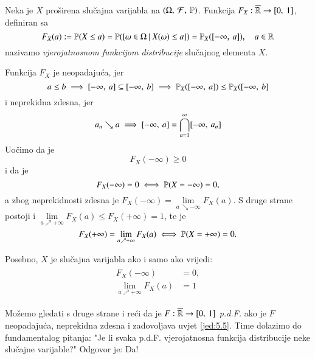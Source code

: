 \begin{defn}    \label{defn:5.4}
    Neka je $X$ pro\v sirena slu\v cajna varijabla na $(\Omega, \: \mathcal{F}, \: \mathbb{P})$.
    Funkcija $F_X : \overline{\mathbb{R}} \to [{0}, \:{1}]$, definiran sa
    \begin{equation*}
        F_X (a) := \mathbb{P} (X \leq a) = \mathbb{P} (\{{\omega \in \Omega} \: | \: {X(\omega) \leq a}\}) = \mathbb{P}_X ([{-\infty}, \:{a}]), \quad a \in \mathbb{R}
    \end{equation*}
    nazivamo \emph{vjerojatnosnom funkcijom distribucije} slu\v cajnog elementa $X$.
\end{defn}

Funkcija $F_X$ je neopadaju\' ca, jer
\begin{equation*}
    a \leq b \implies [{-\infty}, \:{a}] \subseteq [{-\infty}, \:{b}] \implies \mathbb{P}_X ([{-\infty}, \:{a}]) \leq \mathbb{P}_X ([{-\infty}, \:{b}]
\end{equation*}
i neprekidna zdesna, jer
\begin{equation*}
    a_n \searrow a \implies [{-\infty}, \:{a}] = \bigcap\limits_{n = 1}^{\infty} [{-\infty}, \:{a_n}]
\end{equation*}
Uo\v cimo da je
\begin{equation*}
    F_X (-\infty) \geq 0
\end{equation*}
i da je
\begin{equation*}
    F_X (-\infty) = 0 \iff \mathbb{P} (X = -\infty) = 0,
\end{equation*}
a zbog neprekidnosti zdesna je $F_X (-\infty) = \lim\limits_{a \ \searrow -\infty} F_X (a)$.
S druge strane postoji i $\lim\limits_{a \nearrow +\infty} F_X (a) \leq F_X(+\infty) = 1$, te je
\begin{equation*}
    F_X(+\infty) = \lim\limits_{a \nearrow +\infty} F_X (a) \iff \mathbb{P} (X = +\infty) = 0.
\end{equation*}

Posebno, $X$ je slu\v cajna varijabla ako i samo ako vrijedi:
\begin{align}    \label{jed:5.5}
    \begin{split}
        F_X(-\infty) &= 0, \\
        \lim\limits_{a \nearrow +\infty} F_X(a) &= 1
    \end{split}
\end{align}

Mo\v zemo gledati s druge strane i re\' ci da je $F: \overline{\mathbb{R}} \to [{0}, \:{1}]$ \emph{p.d.F.} ako je $F$ neopadaju\' ca, neprekidna zdesna i zadovoljava uvjet \eqref{jed:5.5}.
Time dolazimo do fundamentalog pitanja: "Je li svaka p.d.F. vjerojatnosna funkcija distribucije neke slu\v cajne varijable?"
Odgovor je: Da!

